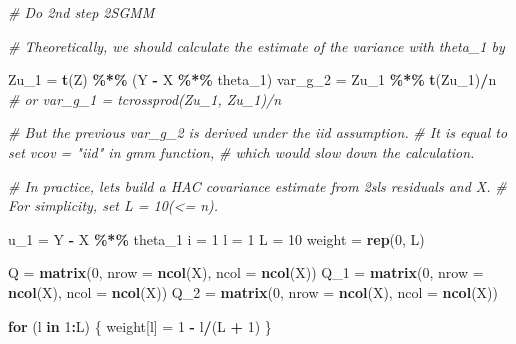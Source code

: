 \documentclass[
  12pt,
]{article}
\newenvironment{Shaded}{\begin{snugshade}}{\end{snugshade}}
\newcommand{\CommentTok}[1]{\textcolor[rgb]{0.56,0.35,0.01}{\textit{#1}}}
\newcommand{\ControlFlowTok}[1]{\textcolor[rgb]{0.13,0.29,0.53}{\textbf{#1}}}
\newcommand{\DataTypeTok}[1]{\textcolor[rgb]{0.13,0.29,0.53}{#1}}
\newcommand{\DecValTok}[1]{\textcolor[rgb]{0.00,0.00,0.81}{#1}}
\newcommand{\KeywordTok}[1]{\textcolor[rgb]{0.13,0.29,0.53}{\textbf{#1}}}
\newcommand{\NormalTok}[1]{#1}
\newcommand{\OperatorTok}[1]{\textcolor[rgb]{0.81,0.36,0.00}{\textbf{#1}}}
\newcommand{\StringTok}[1]{\textcolor[rgb]{0.31,0.60,0.02}{#1}}
\begin{document}
\begin{Shaded}
\begin{Highlighting}[]
\CommentTok{\# Do 2nd step 2SGMM}

\CommentTok{\# Theoretically, we should calculate the estimate of the variance with theta\_1 by}

\NormalTok{Zu\_}\DecValTok{1}\NormalTok{    =}\StringTok{ }\KeywordTok{t}\NormalTok{(Z) }\OperatorTok{\%*\%}\StringTok{ }\NormalTok{(Y }\OperatorTok{{-}}\StringTok{ }\NormalTok{X }\OperatorTok{\%*\%}\StringTok{ }\NormalTok{theta\_}\DecValTok{1}\NormalTok{)}
\NormalTok{var\_g\_}\DecValTok{2}\NormalTok{ =}\StringTok{ }\NormalTok{Zu\_}\DecValTok{1} \OperatorTok{\%*\%}\StringTok{ }\KeywordTok{t}\NormalTok{(Zu\_}\DecValTok{1}\NormalTok{)}\OperatorTok{/}\NormalTok{n}
\CommentTok{\# or var\_g\_1 = tcrossprod(Zu\_1, Zu\_1)/n}

\CommentTok{\# But the previous var\_g\_2 is derived under the iid assumption. }
\CommentTok{\# It is equal to set vcov = "iid" in gmm function, }
\CommentTok{\# which would slow down the calculation.}

\CommentTok{\# In practice, let\textquotesingle{}s build a HAC covariance estimate from 2sls residuals and X.}
\CommentTok{\# For simplicity, set L = 10(\textless{}= n). }

\NormalTok{u\_}\DecValTok{1}\NormalTok{ =}\StringTok{ }\NormalTok{Y }\OperatorTok{{-}}\StringTok{ }\NormalTok{X }\OperatorTok{\%*\%}\StringTok{ }\NormalTok{theta\_}\DecValTok{1}
\NormalTok{i =}\StringTok{ }\DecValTok{1}
\NormalTok{l =}\StringTok{ }\DecValTok{1}
\NormalTok{L =}\StringTok{ }\DecValTok{10}
\NormalTok{weight =}\StringTok{ }\KeywordTok{rep}\NormalTok{(}\DecValTok{0}\NormalTok{, L)}

\NormalTok{Q =}\StringTok{ }\KeywordTok{matrix}\NormalTok{(}\DecValTok{0}\NormalTok{, }\DataTypeTok{nrow =} \KeywordTok{ncol}\NormalTok{(X), }\DataTypeTok{ncol =} \KeywordTok{ncol}\NormalTok{(X))}
\NormalTok{Q\_}\DecValTok{1}\NormalTok{ =}\StringTok{ }\KeywordTok{matrix}\NormalTok{(}\DecValTok{0}\NormalTok{, }\DataTypeTok{nrow =} \KeywordTok{ncol}\NormalTok{(X), }\DataTypeTok{ncol =} \KeywordTok{ncol}\NormalTok{(X))}
\NormalTok{Q\_}\DecValTok{2}\NormalTok{ =}\StringTok{ }\KeywordTok{matrix}\NormalTok{(}\DecValTok{0}\NormalTok{, }\DataTypeTok{nrow =} \KeywordTok{ncol}\NormalTok{(X), }\DataTypeTok{ncol =} \KeywordTok{ncol}\NormalTok{(X))}

\ControlFlowTok{for}\NormalTok{ (l }\ControlFlowTok{in} \DecValTok{1}\OperatorTok{:}\NormalTok{L) \{}
\NormalTok{    weight[l] =}\StringTok{ }\DecValTok{1} \OperatorTok{{-}}\StringTok{ }\NormalTok{l}\OperatorTok{/}\NormalTok{(L }\OperatorTok{+}\StringTok{ }\DecValTok{1}\NormalTok{)}
\NormalTok{\}}


\end{Highlighting}
\end{Shaded}
\end{document}
